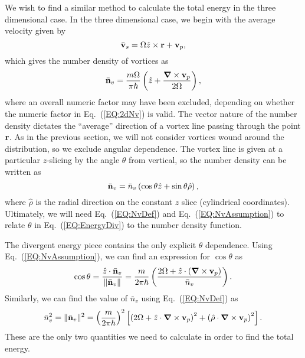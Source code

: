 \documentclass[onecolumn,nofootinbib,superscriptaddress]{revtex4}
\begin{document}
We wish to find a similar method to calculate the total energy in the three dimensional case.  In the three dimensional case, we begin with the average velocity given by
\begin{equation}
\bar{\bf v}_s = \Omega\hat{z}\times{\bf r} + {\bf v}_p,
\end{equation}
which gives the number density of vortices as
\begin{equation}
\bar{\bf n}_v = \frac{m\Omega}{\pi \hbar}\left(\hat{z}+\frac{{\boldsymbol \nabla}\times {\bf v}_p}{2\Omega}\right), \label{EQ:NvDef}
\end{equation}
where an overall numeric factor may have been excluded, depending on whether the numeric factor in Eq.~(\ref{EQ:2dNv}) is valid.  The vector nature of the number density dictates the ``average'' direction of a vortex line passing through the point ${\bf r}$.  As in the previous section, we will not consider vortices wound around the distribution, so we exclude angular dependence.  The vortex line is given at a particular $z$-slicing by the angle $\theta$ from vertical, so the number density can be written as
\begin{equation}
\bar{\bf n}_v = \bar{n}_v \left(\cos\theta\hat{z}+\sin\theta\hat{\rho}\right), \label{EQ:NvAssumption}
\end{equation}
where $\hat{\rho}$ is the radial direction on the constant $z$ slice (cylindrical coordinates).  Ultimately, we will need Eq.~(\ref{EQ:NvDef}) and Eq.~(\ref{EQ:NvAssumption}) to relate $\theta$ in Eq.~(\ref{EQ:EnergyDiv}) to the number density function.

The divergent energy piece contains the only explicit $\theta$ dependence.  Using Eq.~(\ref{EQ:NvAssumption}), we can find an expression for $\cos\theta$ as
\begin{equation}
\cos\theta = \frac{\hat{z}\cdot \bar{\bf n}_v}{\|\bar{\bf n}_v\|} = \frac{m}{2\pi\hbar}\left(\frac{2\Omega+\hat{z}\cdot\left({\boldsymbol \nabla}\times{\bf v}_p\right)}{\bar{n}_v}\right).
\end{equation}
Similarly, we can find the value of $\bar{n}_v$ using Eq.~(\ref{EQ:NvDef}) as
\begin{equation}
\bar{n}_v^2 = \|\bar{\bf n}_v\|^2 = \left(\frac{m}{2\pi\hbar}\right)^2\left[\left(2\Omega+\hat{z}\cdot{\boldsymbol \nabla}\times{\bf v}_p\right)^2 + \left(\hat{\rho}\cdot{\boldsymbol \nabla}\times{\bf v}_p\right)^2\right]. \label{EQ:nvDef}
\end{equation}
These are the only two quantities we need to calculate in order to find the total energy.
\end{document}
